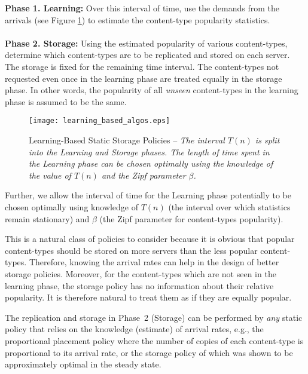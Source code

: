 \documentclass[10pt, conference, letterpaper]{IEEEtran}
\begin{document}
\noindent \textbf{Phase 1. Learning:} Over this interval of time, use
the demands from the arrivals (see Figure
\ref{fig:learning_based_storage}) to estimate
the content-type popularity statistics. \\\\
\noindent \textbf{Phase 2. Storage:} Using the estimated popularity of
various content-types, determine which content-types are to be replicated
and stored on each server. The storage is fixed for the remaining time
interval. The content-types not requested even once in the learning
phase are treated equally in the storage phase. In other words, the
popularity of all {\em unseen} content-types in the learning phase is
assumed to be the same.\\

\begin{figure}[h]
	\begin{center}
		\texttt{[image: learning\_based\_algos.eps]}
		\caption{Learning-Based Static Storage Policies -- \sl The interval
			$T(n)$ is split into the Learning and Storage phases. The length of time spent in the Learning phase can be chosen optimally using the knowledge of the value of $T(n)$ and the Zipf parameter $\beta$. \label{fig:learning_based_storage}}
	\end{center}
\end{figure}

Further, we allow the interval of time for the Learning phase potentially
to be chosen optimally using knowledge of $T(n)$ (the interval over
which statistics remain stationary) and $\beta$ (the Zipf parameter
for content-types popularity).


This is a natural class of policies to consider because it is obvious
that popular content-types should be stored on more servers than the
less popular content-types. Therefore, knowing the arrival rates can
help in the design of better storage policies. Moreover, for the
content-types which are not seen in the learning phase, the storage
policy has no information about their relative popularity. It is
therefore natural to treat them as if they are equally popular.

The replication and storage in Phase~2 (Storage) can be performed by
\textit{any} static policy that relies on the knowledge (estimate) of
arrival rates, e.g., the proportional placement policy \cite{LLM12}
where the number of copies of each content-type is proportional
to its arrival rate, or the storage policy of \cite{LLM13} which was
shown to be approximately optimal in the steady state.
\end{document}
